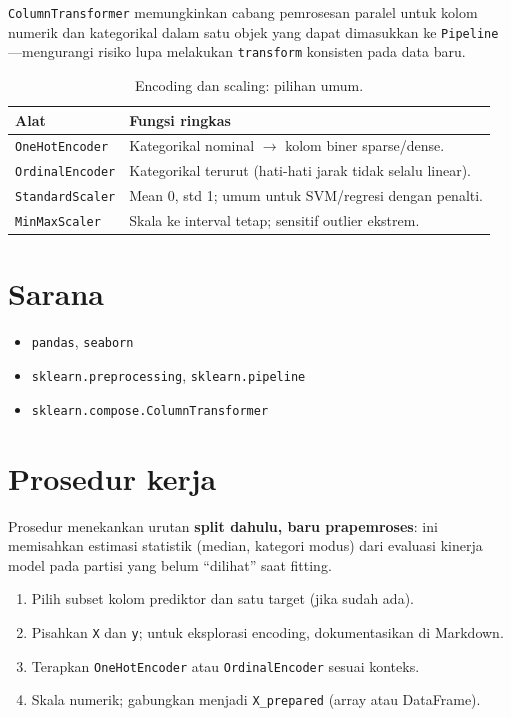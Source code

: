 \documentclass[../main.tex]{subfiles}
\begin{document}
\texttt{ColumnTransformer} memungkinkan cabang pemrosesan paralel untuk kolom numerik dan kategorikal dalam satu objek yang dapat dimasukkan ke \texttt{Pipeline}---mengurangi risiko lupa melakukan \texttt{transform} konsisten pada data baru.



\begin{table}[htbp]
\centering
\caption{Encoding dan scaling: pilihan umum.}
\label{tab:encoding-scaling}
\begin{tabular}{@{}p{3.5cm}p{9.2cm}@{}}
\toprule
\textbf{Alat} & \textbf{Fungsi ringkas} \\
\midrule
\texttt{OneHotEncoder} & Kategorikal nominal $\rightarrow$ kolom biner sparse/dense. \\
\texttt{OrdinalEncoder} & Kategorikal terurut (hati-hati jarak tidak selalu linear). \\
\texttt{StandardScaler} & Mean 0, std 1; umum untuk SVM/regresi dengan penalti. \\
\texttt{MinMaxScaler} & Skala ke interval tetap; sensitif outlier ekstrem. \\
\bottomrule
\end{tabular}
\end{table}

\section{Sarana}

\begin{itemize}[leftmargin=*, nosep]
  \item \texttt{pandas}, \texttt{seaborn}
  \item \texttt{sklearn.preprocessing}, \texttt{sklearn.pipeline}
  \item \texttt{sklearn.compose.ColumnTransformer}
\end{itemize}

\section{Prosedur kerja}

Prosedur menekankan urutan \textbf{split dahulu, baru prapemroses}: ini memisahkan estimasi statistik (median, kategori modus) dari evaluasi kinerja model pada partisi yang belum ``dilihat'' saat fitting.

\begin{enumerate}[leftmargin=*]
  \item Pilih subset kolom prediktor dan satu target (jika sudah ada).
  \item Pisahkan \texttt{X} dan \texttt{y}; untuk eksplorasi encoding, dokumentasikan di Markdown.
  \item Terapkan \texttt{OneHotEncoder} atau \texttt{OrdinalEncoder} sesuai konteks.
  \item Skala numerik; gabungkan menjadi \texttt{X\_prepared} (array atau DataFrame).
\end{enumerate}
\end{document}
